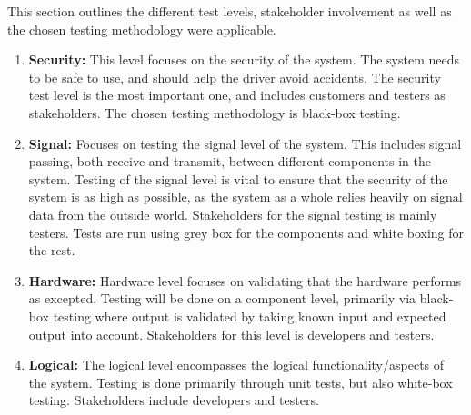 This section outlines the different test levels, stakeholder involvement as well as the chosen testing methodology were applicable.
\begin{enumerate}
    \item \textbf{Security:} This level focuses on the security of the system. The system needs to be safe to use, and should help the driver avoid accidents. The security test level is the most important one, and includes customers and testers as stakeholders. The chosen testing methodology is black-box testing. 
    \item \textbf{Signal:} Focuses on testing the signal level of the system. This includes signal passing, both receive and transmit, between different components in the system. Testing of the signal level is vital to ensure that the security of the system is as high as possible, as the system as a whole relies heavily on signal data from the outside world. Stakeholders for the signal testing is mainly testers. Tests are run using grey box for the components and white boxing for the rest.
    \item \textbf{Hardware:} Hardware level focuses on validating that the hardware performs as excepted. Testing will be done on a component level, primarily via black-box testing where output is validated by taking known input and expected output into account. Stakeholders for this level is developers and testers.
    \item \textbf{Logical:} The logical level encompasses the logical functionality/aspects of the system. Testing is done primarily through unit tests, but also white-box testing. Stakeholders include developers and testers.
\end{enumerate}

